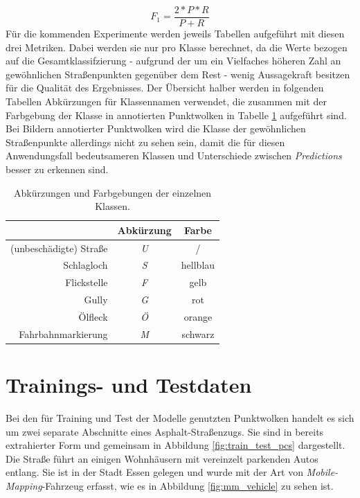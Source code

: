 \begin{equation}
    F_1 = \frac{2 * P * R}{P + R}
\end{equation}
Für die kommenden Experimente werden jeweils Tabellen aufgeführt mit diesen drei Metriken. Dabei werden sie nur pro Klasse berechnet, da die Werte bezogen auf die Gesamtklassifzierung - aufgrund der um ein Vielfaches höheren Zahl an gewöhnlichen Straßenpunkten gegenüber dem Rest - wenig Aussagekraft besitzen für die Qualität des Ergebnisses. Der Übersicht halber werden in folgenden Tabellen Abkürzungen für Klassennamen verwendet, die zusammen mit der Farbgebung der Klasse in annotierten Punktwolken in Tabelle \ref{table:classes_abbr} aufgeführt sind. Bei Bildern annotierter Punktwolken wird die Klasse der gewöhnlichen Straßenpunkte allerdings nicht zu sehen sein, damit die für diesen Anwendungsfall bedeutsameren Klassen und Unterschiede zwischen \textit{Predictions} besser zu erkennen sind.

\begin{table}
\centering
\begin{tabular}{r|c|c}
& Abkürzung & Farbe \\
\hline
(unbeschädigte) Straße & \textit{U} & / \\
Schlagloch & \textit{S} & hellblau \\
Flickstelle & \textit{F} & gelb \\
Gully & \textit{G} & rot \\
Ölfleck & \textit{Ö} & orange \\
Fahrbahnmarkierung & \textit{M} & schwarz \\
\end{tabular}
\caption{Abkürzungen und Farbgebungen der einzelnen Klassen.}
\label{table:classes_abbr}
\end{table}

\section{Trainings- und Testdaten}

Bei den für Training und Test der Modelle genutzten Punktwolken handelt es sich um zwei separate Abschnitte eines Asphalt-Straßenzugs. Sie sind in bereits extrahierter Form und gemeinsam in Abbildung \ref{fig:train_test_pcs} dargestellt. Die Straße führt an einigen Wohnhäusern mit vereinzelt parkenden Autos entlang. Sie ist in der Stadt Essen gelegen und wurde mit der Art von \textit{Mobile-Mapping}-Fahrzeug erfasst, wie es in Abbildung \ref{fig:mm_vehicle} zu sehen ist. \\

